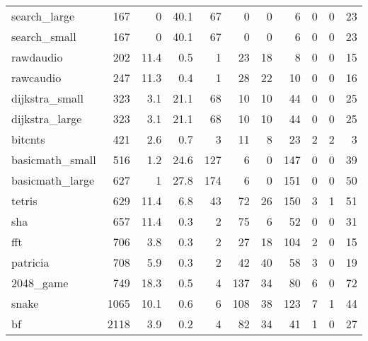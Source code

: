 \begin{tabular}{lrrrrrrrrrr}
 search\_large    &            167 &      0   &   40.1 &   67 &      0 &          0 &            6 &     0 &     0 &    23 \\
 search\_small    &            167 &      0   &   40.1 &   67 &      0 &          0 &            6 &     0 &     0 &    23 \\
 rawdaudio       &            202 &     11.4 &    0.5 &    1 &     23 &         18 &            8 &     0 &     0 &    15 \\
 rawcaudio       &            247 &     11.3 &    0.4 &    1 &     28 &         22 &           10 &     0 &     0 &    16 \\
 dijkstra\_small  &            323 &      3.1 &   21.1 &   68 &     10 &         10 &           44 &     0 &     0 &    25 \\
 dijkstra\_large  &            323 &      3.1 &   21.1 &   68 &     10 &         10 &           44 &     0 &     0 &    25 \\
 bitcnts         &            421 &      2.6 &    0.7 &    3 &     11 &          8 &           23 &     2 &     2 &     3 \\
 basicmath\_small &            516 &      1.2 &   24.6 &  127 &      6 &          0 &          147 &     0 &     0 &    39 \\
 basicmath\_large &            627 &      1   &   27.8 &  174 &      6 &          0 &          151 &     0 &     0 &    50 \\
 tetris          &            629 &     11.4 &    6.8 &   43 &     72 &         26 &          150 &     3 &     1 &    51 \\
 sha             &            657 &     11.4 &    0.3 &    2 &     75 &          6 &           52 &     0 &     0 &    31 \\
 fft             &            706 &      3.8 &    0.3 &    2 &     27 &         18 &          104 &     2 &     0 &    15 \\
 patricia        &            708 &      5.9 &    0.3 &    2 &     42 &         40 &           58 &     3 &     0 &    19 \\
 2048\_game       &            749 &     18.3 &    0.5 &    4 &    137 &         34 &           80 &     6 &     0 &    72 \\
 snake           &           1065 &     10.1 &    0.6 &    6 &    108 &         38 &          123 &     7 &     1 &    44 \\
 bf              &           2118 &      3.9 &    0.2 &    4 &     82 &         34 &           41 &     1 &     0 &    27 \\

\end{tabular}
